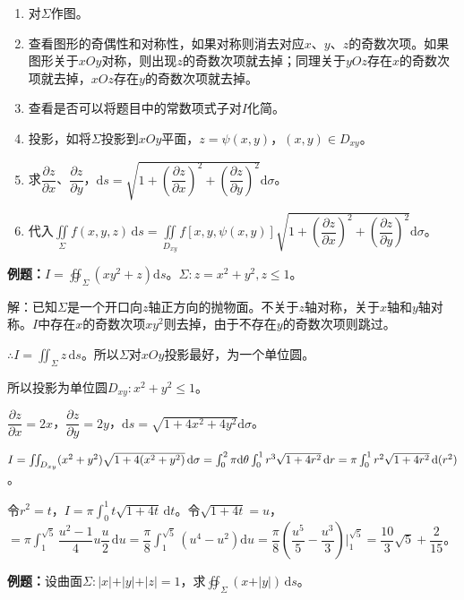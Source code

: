 \documentclass[UTF8, 12pt]{ctexart}
\begin{document}
\begin{enumerate}
    \item 对$\Sigma$作图。
    \item 查看图形的奇偶性和对称性，如果对称则消去对应$x$、$y$、$z$的奇数次项。如果图形关于$xOy$对称，则出现$z$的奇数次项就去掉；同理关于$yOz$存在$x$的奇数次项就去掉，$xOz$存在$y$的奇数次项就去掉。
    \item 查看是否可以将题目中的常数项式子对$I$化简。
    \item 投影，如将$\Sigma$投影到$xOy$平面，$z=\psi(x,y)$，$(x,y)\in D_{xy}$。
    \item 求$\dfrac{\partial z}{\partial x}$、$\dfrac{\partial z}{\partial y}$，$\textrm{d}s=\sqrt{1+\left(\dfrac{\partial z}{\partial x}\right)^2+\left(\dfrac{\partial z}{\partial y}\right)^2}\textrm{d}\sigma$。
    \item 代入$\displaystyle{\iint\limits_\Sigma f(x,y,z)\,\textrm{d}s=\iint\limits_{D_{xy}}f[x,y,\psi(x,y)]\sqrt{1+\left(\dfrac{\partial z}{\partial x}\right)^2+\left(\dfrac{\partial z}{\partial y}\right)^2}\textrm{d}\sigma}$。
\end{enumerate}

\textbf{例题：}$I=\oiint_\Sigma(xy^2+z)\textrm{d}s$。$\Sigma:z=x^2+y^2,z\leqslant1$。

解：已知$\Sigma$是一个开口向$z$轴正方向的抛物面。不关于$z$轴对称，关于$x$轴和$y$轴对称。$I$中存在$x$的奇数次项$xy^2$则去掉，由于不存在$y$的奇数次项则跳过。

$\therefore I=\iint_\Sigma z\,\textrm{d}s$。所以$\Sigma$对$xOy$投影最好，为一个单位圆。

所以投影为单位圆$D_{xy}:x^2+y^2\leqslant1$。

$\dfrac{\partial z}{\partial x}=2x$，$\dfrac{\partial z}{\partial y}=2y$，$\textrm{d}s=\sqrt{1+4x^2+4y^2}\textrm{d}\sigma$。

$I=\iint_{D_{xy}}(x^2+y^2)\sqrt{1+4(x^2+y^2)}\,\textrm{d}\sigma=\int_0^2\pi\textrm{d}\theta\int_0^1r^3\sqrt{1+4r^2}\,\textrm{d}r=\\\pi\int_0^1r^2\sqrt{1+4r^2}\,\textrm{d}(r^2)$。

令$r^2=t$，$I=\pi\int_0^1t\sqrt{1+4t}\,\textrm{d}t$。令$\sqrt{1+4t}=u$，$=\pi\int_1^{\sqrt{5}}\dfrac{u^2-1}{4}u\dfrac{u}{2}\,\textrm{d}u=\dfrac{\pi}{8}\int_1^{\sqrt{5}}(u^4-u^2)\textrm{d}u=\dfrac{\pi}{8}(\dfrac{u^5}{5}-\dfrac{u^3}{3})\bigg\vert_1^{\sqrt{5}}=\dfrac{10}{3}\sqrt{5}+\dfrac{2}{15}$。

\textbf{例题：}设曲面$\Sigma:\vert x\vert+\vert y\vert+\vert z\vert=1$，求$\oiint_\Sigma(x+\vert y\vert)\,\textrm{d}s$。
\end{document}
